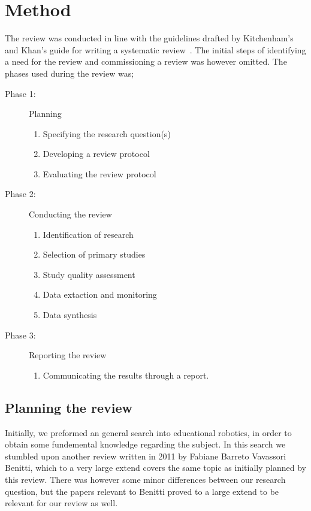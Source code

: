 \section{Method}
The review was conducted in line with the guidelines drafted by Kitchenham's and Khan's guide for writing a systematic review~\cite{kitchenham2007guidelines,khan2001undertaking}. 
The initial steps of identifying a need for the review and commissioning a review was however omitted. 
The phases used during the review was; 
\begin{description}
	\item[Phase 1: ] Planning
		\begin{enumerate}
			\item Specifying the research question(s)
			\item Developing a review protocol
			\item Evaluating the review protocol
		\end{enumerate}
	\item[Phase 2: ] Conducting the review
		\begin{enumerate}
			\item Identification of research
			\item Selection of primary studies
			\item Study quality assessment
			\item Data extaction and monitoring
			\item Data synthesis
		\end{enumerate}
	\item[Phase 3: ] Reporting the review
		\begin{enumerate}
			\item Communicating the results through a report.
		\end{enumerate}
\end{description}

\subsection{Planning the review}\label{sec:questions}
Initially, we preformed an general search into educational robotics, in order to obtain some fundemental knowledge regarding the subject. In this search we stumbled upon another review written in 2011 by Fabiane Barreto Vavassori Benitti\cite{Benitti2012978}, which to a very large extend covers the same topic as initially planned by this review. There was however some minor differences between our research question, but the papers relevant to Benitti proved to a large extend to be relevant for our review as well. 


